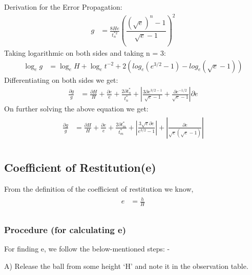 \documentclass[11pt]{scrartcl} %
\begin{document}
Derivation for the Error Propagation:
\begin{align} 
		g &= \frac{8He}{t_{n}^{*2}}\left(\dfrac{(\sqrt{e})^n-1}{\sqrt{e}-1}\right)^2 \nonumber
\end{align}
    Taking logarithmic on both sides and taking n = 3:
\begin{align} 
            \log_e g &= \log_e H + \log_e t^{-2} + 2(log_e ({e^{3/2}-1}) - log_e ({\sqrt{e}-1})) \nonumber
\end{align}
    Differentiating on both sides we get:
\begin{align} 
        \frac{\partial{g}}{g} &= \frac{\partial{H}}{H} + \frac{\partial{e}}{e} + \frac{2\partial{t_n^*}}{t_n^*} + \left|\frac{3\partial{e^{3/2-1}}}{\sqrt{e}-1} + \frac{\partial{e^{-1/2}}}{\sqrt{e}-1}\right|\partial{e} \nonumber
\end{align}
   On further solving the above equation we get:
\begin{align} 
	\begin{split}
		\frac{\partial{g}}{g} &= \frac{\partial{H}}{H} + \frac{\partial{e}}{e}+\frac{2\partial{t_m^*}}{t_m^*}+\left|\frac{3\sqrt{e}\partial{e}}{e^{3/2}-1}\right|+\left|\frac{\partial{e}}{\sqrt{e}(\sqrt{e}-1)}\right|\\
	\end{split}					
\end{align}

\subsection{Coefficient of Restitution(e)}
From the definition of the coefficient of restitution we know, 
\begin{align} 
	\begin{split}
		e &= \frac{h}{H}\\
	\end{split}					
\end{align}

\subsubsection{Procedure (for calculating e)}
For finding e, we follow the below-mentioned steps: - \par

A) Release the ball from some height ‘H’ and note it in the observation table. \par
\end{document}
